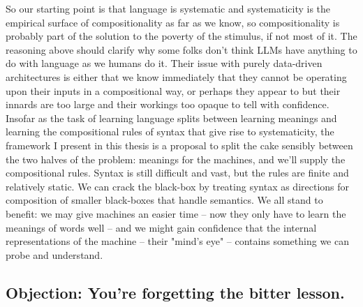  So our starting point is that language is systematic and systematicity is the empirical surface of compositionality as far as we know, so compositionality is probably part of the solution to the poverty of the stimulus, if not most of it. The reasoning above should clarify why some folks don't think LLMs have anything to do with language as we humans do it. Their issue with purely data-driven architectures is either that we know immediately that they cannot be operating upon their inputs in a compositional way, or perhaps they appear to but their innards are too large and their workings too opaque to tell with confidence. Insofar as the task of learning language splits between learning meanings and learning the compositional rules of syntax that give rise to systematicity, the framework I present in this thesis is a proposal to split the cake sensibly between the two halves of the problem: meanings for the machines, and we'll supply the compositional rules. Syntax is still difficult and vast, but the rules are finite and relatively static. We can crack the black-box by treating syntax as directions for composition of smaller black-boxes that handle semantics. We all stand to benefit: we may give machines an easier time -- now they only have to learn the meanings of words well -- and we might gain confidence that the internal representations of the machine -- their "mind's eye" -- contains something we can probe and understand.

\subsection{\textbf{Objection:} You're forgetting the bitter lesson.}

